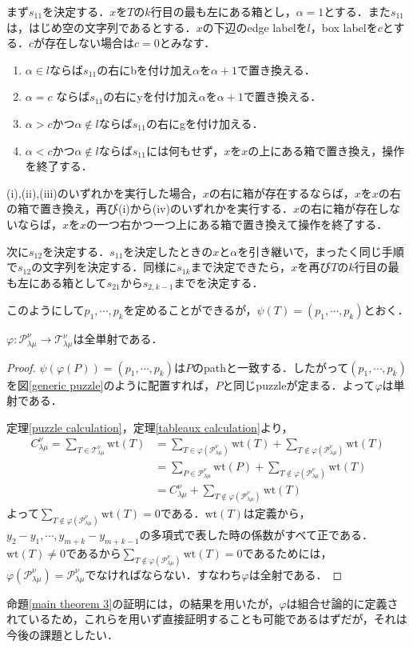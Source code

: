 まず$s_{11}$を決定する．$x$を$T$の$k$行目の最も左にある箱とし，$\alpha = 1$とする．また$s_{11}$は，はじめ空の文字列であるとする．$x$の下辺のedge labelを$l$，box labelを$c$とする．$c$が存在しない場合は$c=0$とみなす．
\begin{enumerate}
  \item $\alpha \in l$ならば$s_{11}$の右にbを付け加え$\alpha$を$\alpha+1$で置き換える．
  \item $\alpha = c$ ならば$s_{11}$の右にyを付け加え$\alpha$を$\alpha+1$で置き換える．
  \item $\alpha > c$かつ$\alpha\notin l$ならば$s_{11}$の右にgを付け加える．
  \item $\alpha < c$かつ$\alpha\notin l$ならば$s_{11}$には何もせず，$x$を$x$の上にある箱で置き換え，操作を終了する．
\end{enumerate}
(i),(ii),(iii)のいずれかを実行した場合，$x$の右に箱が存在するならば，$x$を$x$の右の箱で置き換え，再び(i)から(iv)のいずれかを実行する．$x$の右に箱が存在しないならば，$x$を$x$の一つ右かつ一つ上にある箱で置き換えて操作を終了する．

次に$s_{12}$を決定する．$s_{11}$を決定したときの$x$と$\alpha$を引き継いで，まったく同じ手順で$s_{12}$の文字列を決定する．同様に$s_{1k}$まで決定できたら，$x$を再び$T$の$k$行目の最も左にある箱として$s_{21}$から$s_{2,k-1}$までを決定する．

このようにして$p_1,\cdots,p_k$を定めることができるが，$\psi(T)=(p_1,\cdots,p_k)$とおく．


\begin{prop}\label{main theorem 3}
  $\varphi\colon\mathcal{P}^\nu_{\lambda\mu}\rightarrow\mathcal{T}^\nu_{\lambda\mu}$は全単射である．
\end{prop}

\begin{proof}
  $\psi(\varphi(P))=(p_1,\cdots,p_k)$は$P$のpathと一致する．したがって$(p_1,\cdots,p_k)$を図\ref{generic puzzle}のように配置すれば，$P$と同じpuzzleが定まる．よって$\varphi$は単射である．

  定理\ref{puzzle calculation}，定理\ref{tableaux calculation}より，
  \begin{align*}
    C^\nu_{\lambda\mu} = \sum_{T\in\mathcal{T}^\nu_{\lambda\mu}}\text{wt}(T)
    &= \sum_{T\in\varphi(\mathcal{P}^\nu_{\lambda\mu})}\text{wt}(T) + \sum_{T\notin\varphi(\mathcal{P}^\nu_{\lambda\mu})}\text{wt}(T)\\
    &= \sum_{P\in\mathcal{P}^\nu_{\lambda\mu}}\text{wt}(P) + \sum_{T\notin\varphi(\mathcal{P}^\nu_{\lambda\mu})}\text{wt}(T)\\
    &=C^\nu_{\lambda\mu} + \sum_{T\notin\varphi(\mathcal{P}^\nu_{\lambda\mu})}\text{wt}(T)
  \end{align*}
  よって$\sum_{T\notin\varphi(\mathcal{P}^\nu_{\lambda\mu})}\text{wt}(T)=0$である．$\text{wt}(T)$は定義から，$y_2-y_1,\cdots,y_{m+k}-y_{m+k-1}$の多項式で表した時の係数がすべて正である．$\text{wt}(T)\neq 0$であるから$\sum_{T\notin\varphi(\mathcal{P}^\nu_{\lambda\mu})}\text{wt}(T)=0$であるためには，
  $\varphi(\mathcal{P}^\nu_{\lambda\mu})=\mathcal{P}^\nu_{\lambda\mu}$でなければならない．すなわち$\varphi$は全射である．
\end{proof}

命題\ref{main theorem 3}の証明には\cite{knutson tao}，\cite{thomas yong}の結果を用いたが，$\varphi$は組合せ論的に定義されているため，これらを用いず直接証明することも可能であるはずだが，それは今後の課題としたい．


